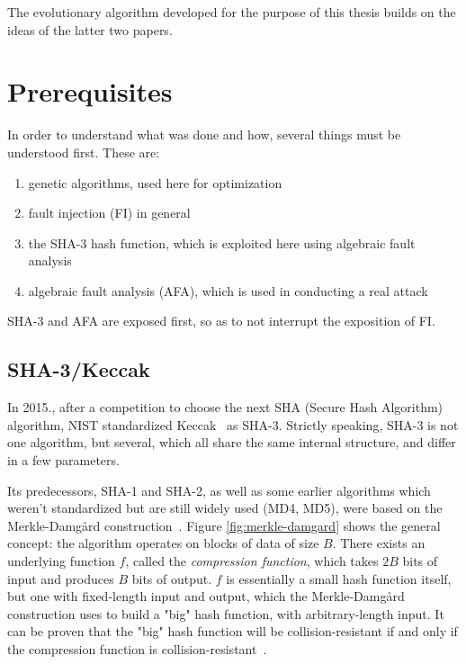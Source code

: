 \documentclass[times, utf8, diplomski]{fer}
\begin{document}
The evolutionary algorithm developed for the purpose of this thesis builds on
the ideas of the latter two papers.



\chapter{Prerequisites}\label{ch:prerequisites}
In order to understand what was done and how, several things must be understood
first. These are:
\begin{enumerate}
    \item genetic algorithms, used here for optimization
    \item fault injection (FI) in general
    \item the SHA-3 hash function, which is exploited here using algebraic fault analysis
    \item algebraic fault analysis (AFA), which is used in conducting a real attack
\end{enumerate}

SHA-3 and AFA are exposed first, so as to not interrupt the exposition of FI.


\section{SHA-3/Keccak}\label{sec:keccak}
In 2015., after a competition to choose the next SHA (Secure Hash Algorithm)
algorithm, NIST standardized Keccak~\cite{keccak_reference} as SHA-3.
Strictly speaking, SHA-3 is not one algorithm, but several, which all share
the same internal structure, and differ in a few parameters.

Its predecessors, SHA-1 and SHA-2, as well as some earlier algorithms which
weren't standardized but are still widely used (MD4, MD5), were based on the
Merkle-Damgård construction~\cite{merkle-damgard_revisited}. Figure \ref{fig:merkle-damgard}
shows the general concept: the algorithm operates on blocks of data of size $B$.
There exists an underlying function $f$, called the \emph{compression function},
which takes $2B$ bits of input and produces $B$ bits of output. $f$ is essentially
a small hash function itself, but one with fixed-length input and output, which
the Merkle-Damgård construction uses to build a "big" hash function, with
arbitrary-length input. It can be proven that the "big" hash function will
be collision-resistant if and only if the compression function is
collision-resistant~\cite{merkle-damgard_security}.
\end{document}
